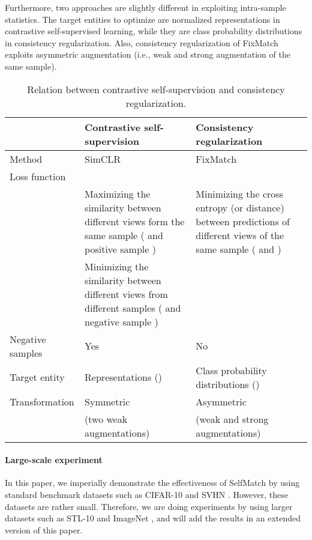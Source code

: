 \documentclass{article}
\begin{document}
Furthermore, two approaches are slightly different in exploiting intra-sample statistics. The target entities to optimize are normalized representations in contrastive self-supervised learning, while they are class probability distributions in consistency regularization. Also, consistency regularization of FixMatch exploits asymmetric augmentation (i.e., weak and strong augmentation of the same sample).

\begin{table}[h]
  \caption{Relation between contrastive self-supervision and consistency regularization.}
  \label{table:relation-between-contrastive-and-consistency}

  \centering
  \begin{tabular}{m{2.0cm} m{5.3cm} m{5.3cm}}
    \toprule
     & \textbf{Contrastive self-supervision} & \textbf{Consistency regularization}\\
     
    \hline
    \noalign{\smallskip}
    Method & SimCLR \cite{chen2020simple} & FixMatch \cite{sohn2020fixmatch} \\
     
    \hline
    \noalign{\smallskip}
    Loss function &  &  \\
    
    \hline
    \noalign{\smallskip}
     & Maximizing the similarity between different views form the same sample ( and positive sample ) & Minimizing the cross entropy (or distance) between predictions of different views of the same sample ( and ) \\
     & Minimizing the similarity between different views from different samples ( and negative sample ) & \\
    
    \hline
    \noalign{\smallskip}
    Negative samples & Yes & No \\
     
    \hline
    \noalign{\smallskip}
    Target entity & Representations () & Class probability distributions ()\\
    
    \hline
    \noalign{\smallskip}
    Transformation & Symmetric & Asymmetric \\
     & (two weak augmentations) & (weak and strong augmentations) \\
    
    \bottomrule
  \end{tabular}
\end{table}

\paragraph{Large-scale experiment}
In this paper, we imperially demonstrate the effectiveness of SelfMatch by using standard benchmark datasets such as CIFAR-10 \cite{krizhevsky2009learning} and SVHN \cite{netzer2011reading}. However, these datasets are rather small. Therefore, we are doing experiments by using larger datasets such as STL-10 \cite{coates2011analysis} and ImageNet \cite{deng2009imagenet}, and will add the results in an extended version of this paper. 
\end{document}
